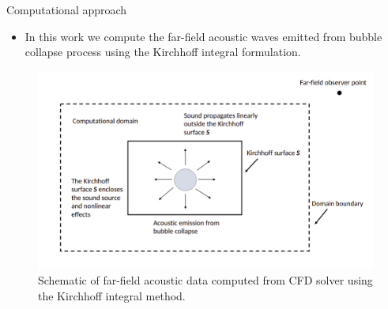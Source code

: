 \documentclass[10pt, aspectratio=169]{beamer}
\begin{document}
\begin{frame}{Computational approach}
	
	\begin{itemize}
		\item In this work we compute the far-field acoustic waves emitted from bubble collapse process using the Kirchhoff integral formulation.
	\end{itemize}

	\begin{figure}
		\centering
		\includegraphics[scale=0.22]{images/shematic1.png}
		\caption{Schematic of far-field acoustic data computed from CFD solver using the Kirchhoff integral method.}
	\end{figure}		

\end{frame}
\end{document}
